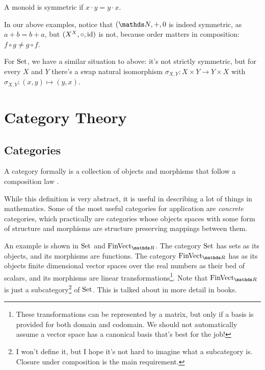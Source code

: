 A monoid is symmetric if $x\cdot y = y\cdot x$.

In our above examples, notice that $(\naturals, +,0$ is indeed symmetric, as $a+b=b+a$, but $(X^X, \circ, \mathrm{id})$ is not, because order matters in composition: $f\circ g \neq g\circ f$.

For $\mathrm{Set}$, we have a similar situation to above: it's not strictly symmetric, but for every $X$ and $Y$ there's a swap natural isomorphism $\sigma_{X,Y} : X\times Y \rightarrow Y\times X$ with $\sigma_{X,Y} : (x,y) \mapsto (y,x)$.

\section{Category Theory}

\subsection{Categories}

A category formally is a collection of objects and morphisms that follow a composition law \cite{context}. 

While this definition is very abstract, it is useful in describing a lot of things  in mathematics.
Some of the most useful categories for application are \emph{concrete} categories, which practically are categories whose objects spaces with some form of structure and morphisms are structure preserving mappings between them.



An example is shown in $\mathrm{Set}$ and $\FinVect$.
The category $\mathrm{Set}$ has sets as its objects, and its morphisms are functions.
The category $\FinVect$ has as its objects finite dimensional vector spaces over the real numbers as their bed of scalars, and its morphisms are linear transformations\footnote{These transformations can be represented by a matrix, but only if a basis is provided for both domain and codomain. We should not automatically assume a vector space has a canonical basis that's best for the job!}.
Note that $\FinVect$ is just a subcategory\footnote{I won't define it, but I hope it's not hard to imagine what a subcategory is. Closure under composition is the main requirement.} of $\mathrm{Set}$. This is talked about in more detail in books.

